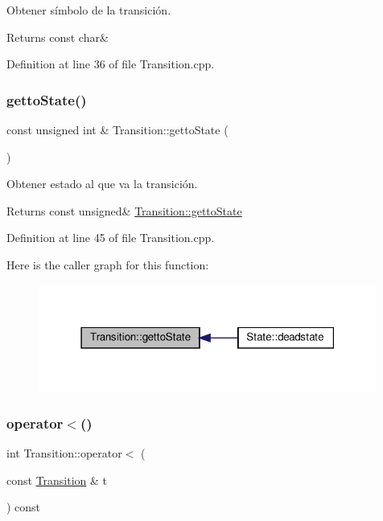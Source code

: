Obtener símbolo de la transición. 

\begin{DoxyReturn}{Returns}
const char\& 
\end{DoxyReturn}


Definition at line 36 of file Transition.\+cpp.

\mbox{\label{class_transition_a39709e1a9cb0b79dea569a4e1a7440c0}} 
\subsubsection{\texorpdfstring{getto\+State()}{gettoState()}}
{\footnotesize\ttfamily const unsigned int \& Transition\+::getto\+State (\begin{DoxyParamCaption}{ }\end{DoxyParamCaption})}



Obtener estado al que va la transición. 

\begin{DoxyReturn}{Returns}
const unsigned\& \hyperlink{class_transition_a39709e1a9cb0b79dea569a4e1a7440c0}{Transition\+::getto\+State} 
\end{DoxyReturn}


Definition at line 45 of file Transition.\+cpp.

Here is the caller graph for this function\+:
\nopagebreak
\begin{figure}[H]
\begin{center}
\leavevmode
\includegraphics[width=315pt]{class_transition_a39709e1a9cb0b79dea569a4e1a7440c0_icgraph}
\end{center}
\end{figure}
\mbox{\label{class_transition_a6dae95e1f97bf6f39a8ae10d210e0257}} 
\subsubsection{\texorpdfstring{operator$<$()}{operator<()}}
{\footnotesize\ttfamily int Transition\+::operator$<$ (\begin{DoxyParamCaption}\item[{const \hyperlink{class_transition}{Transition} \&}]{t }\end{DoxyParamCaption}) const}



